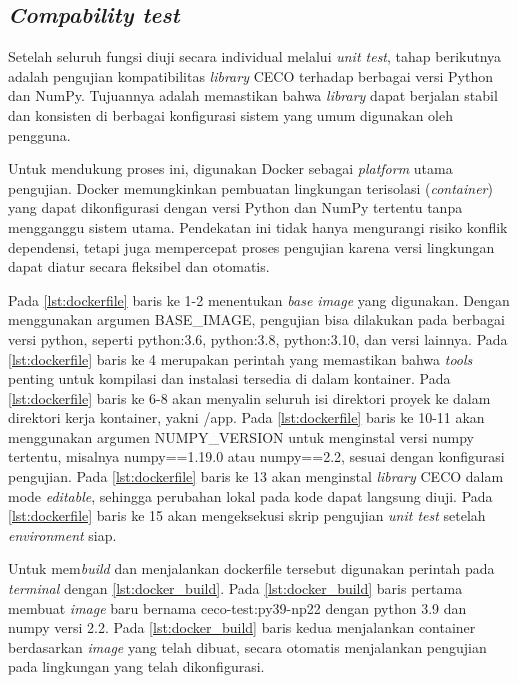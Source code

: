 \subsection{\textit{Compability test}}
Setelah seluruh fungsi diuji secara individual melalui \textit{unit test}, tahap berikutnya adalah pengujian kompatibilitas \textit{library} CECO terhadap berbagai versi Python dan NumPy. Tujuannya adalah memastikan bahwa \textit{library} dapat berjalan stabil dan konsisten di berbagai konfigurasi sistem yang umum digunakan oleh pengguna.

Untuk mendukung proses ini, digunakan Docker sebagai \textit{platform} utama pengujian. Docker memungkinkan pembuatan lingkungan terisolasi (\textit{container}) yang dapat dikonfigurasi dengan versi Python dan NumPy tertentu tanpa mengganggu sistem utama. Pendekatan ini tidak hanya mengurangi risiko konflik dependensi, tetapi juga mempercepat proses pengujian karena versi lingkungan dapat diatur secara fleksibel dan otomatis.

Pada \cref{lst:dockerfile} baris ke 1-2 menentukan \textit{base image} yang digunakan. Dengan menggunakan argumen BASE\_IMAGE, pengujian bisa dilakukan pada berbagai versi python, seperti python:3.6, python:3.8, python:3.10, dan versi lainnya. Pada \cref{lst:dockerfile} baris ke 4 merupakan perintah yang memastikan bahwa \textit{tools} penting untuk kompilasi dan instalasi tersedia di dalam kontainer. Pada \cref{lst:dockerfile} baris ke 6-8 akan menyalin seluruh isi direktori proyek ke dalam direktori kerja kontainer, yakni /app. Pada \cref{lst:dockerfile} baris ke 10-11 akan menggunakan argumen NUMPY\_VERSION untuk menginstal versi numpy tertentu, misalnya numpy==1.19.0 atau numpy==2.2, sesuai dengan konfigurasi pengujian. Pada \cref{lst:dockerfile} baris ke 13 akan menginstal \textit{library} CECO dalam mode \textit{editable}, sehingga perubahan lokal pada kode dapat langsung diuji. Pada \cref{lst:dockerfile} baris ke 15 akan mengeksekusi skrip pengujian \textit{unit test} setelah \textit{environment} siap.


Untuk mem\textit{build} dan menjalankan dockerfile tersebut digunakan perintah pada \textit{terminal} dengan \cref{lst:docker_build}. Pada \cref{lst:docker_build} baris pertama membuat \textit{image} baru bernama ceco-test:py39-np22 dengan python 3.9 dan numpy versi 2.2. Pada \cref{lst:docker_build} baris kedua menjalankan container berdasarkan \textit{image} yang telah dibuat, secara otomatis menjalankan pengujian pada lingkungan yang telah dikonfigurasi.

